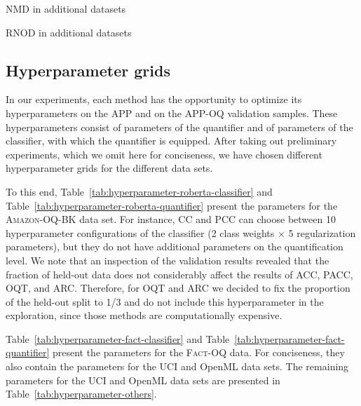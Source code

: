 \documentclass[10pt,a4paper]{article}
\begin{document}
\begin{table}
 \centering
 \caption{NMD in additional datasets}
 \label{tab:main_others_nmd}
 \resizebox{\textwidth}{!}{  }%
\end{table}

\begin{table}
 \centering
 \caption{RNOD in additional datasets}
 \label{tab:main_others_rnod}
 \resizebox{\textwidth}{!}{  }%
\end{table}


\subsection{Hyperparameter grids}

\noindent In our experiments, each method has the opportunity to
optimize its hyperparameters on the APP and on the APP-OQ validation
samples. These hyper\-pa\-ra\-me\-ters consist of parameters of the
quantifier and of parameters of the classifier, with which the
quantifier is equipped. After taking out preliminary experiments,
which we omit here for conciseness, we have chosen different
hyperparameter grids for the different data sets.

To this end, Table~\ref{tab:hyperparameter-roberta-classifier} and
Table~\ref{tab:hyperparameter-roberta-quantifier} present the
parameters for the \textsc{Amazon-OQ-BK} data set. For instance, CC
and PCC can choose between 10 hyperparameter configurations of the
classifier (2 class weights $\times$ 5 regularization parameters), but
they do not have additional parameters on the quantification level. We
note that an inspection of the validation results revealed that the
fraction of held-out data does not considerably affect the results of
ACC, PACC, OQT, and ARC. Therefore, for OQT and ARC we decided to fix the proportion of the held-out split to 1/3 and do not include this hyperparameter in the exploration, since those methods are computationally expensive.%

Table~\ref{tab:hyperparameter-fact-classifier} and
Table~\ref{tab:hyperparameter-fact-quantifier} present the parameters
for the \textsc{Fact-OQ} data. For conciseness, they also contain the
parameters for the UCI and OpenML data sets. The remaining parameters
for the UCI and OpenML data sets are presented in
Table~\ref{tab:hyperparameter-others}.
\end{document}
